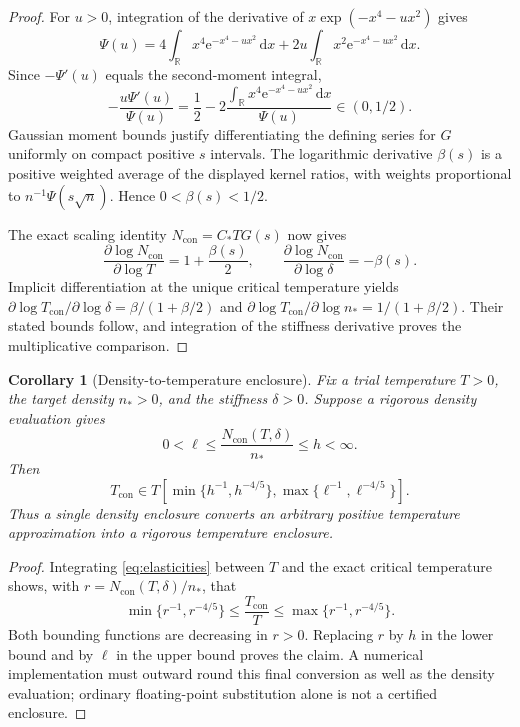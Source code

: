 \documentclass[11pt,a4paper]{article}
\numberwithin{equation}{section}
\newtheorem{corollary}[theorem]{Corollary}
\theoremstyle{definition}
\newcommand{\R}{\mathbb R}
\newcommand{\dd}{\,\mathrm d}
\newcommand{\con}{\mathrm{con}}
\newcommand{\e}{\mathrm e}
\begin{document}
\begin{proof}
For $u>0$, integration of the derivative of
$x\exp(-x^4-u x^2)$ gives
\[
 \Psi(u)=4\int_{\R} x^4\e^{-x^4-u x^2}\dd x
       +2u\int_{\R} x^2\e^{-x^4-u x^2}\dd x.
\]
Since $-\Psi'(u)$ equals the second-moment integral,
\[
 -\frac{u\Psi'(u)}{\Psi(u)}
 =\frac12-
 2\frac{\int_{\R} x^4\e^{-x^4-u x^2}\dd x}{\Psi(u)}
 \in(0,1/2).
\]
Gaussian moment bounds justify differentiating the defining series for
$G$ uniformly on compact positive $s$ intervals. The logarithmic
derivative $\beta(s)$ is a positive weighted average of the displayed
kernel ratios, with weights proportional to
$n^{-1}\Psi(s\sqrt n)$. Hence $0<\beta(s)<1/2$.

The exact scaling identity $N_{\con}=C_*T G(s)$ now gives
\[
 \frac{\partial\log N_{\con}}{\partial\log T}
       =1+\frac{\beta(s)}2,
 \qquad
 \frac{\partial\log N_{\con}}{\partial\log\delta}=-\beta(s).
\]
Implicit differentiation at the unique critical temperature yields
$\partial\log T_{\con}/\partial\log\delta
=\beta/(1+\beta/2)$ and
$\partial\log T_{\con}/\partial\log n_*
=1/(1+\beta/2)$. Their stated bounds follow, and integration of the
stiffness derivative proves the multiplicative comparison.
\end{proof}

\begin{corollary}[Density-to-temperature enclosure]
\label{cor:densitytemperature}
Fix a trial temperature $T>0$, the target density $n_*>0$, and the
stiffness $\delta>0$. Suppose a rigorous density evaluation gives
\[
 0<\ell\le \frac{N_{\con}(T,\delta)}{n_*}\le h<\infty.
\]
Then
\begin{equation}
 T_{\con}\in T\left[
 \min\{h^{-1},h^{-4/5}\},
 \max\{\ell^{-1},\ell^{-4/5}\}
 \right].
 \label{eq:temperatureenclosure}
\end{equation}
Thus a single density enclosure converts an arbitrary positive
temperature approximation into a rigorous temperature enclosure.
\end{corollary}

\begin{proof}
Integrating \eqref{eq:elasticities} between $T$ and the exact critical
temperature shows, with $r=N_{\con}(T,\delta)/n_*$, that
\[
 \min\{r^{-1},r^{-4/5}\}
 \le \frac{T_{\con}}{T}
 \le \max\{r^{-1},r^{-4/5}\}.
\]
Both bounding functions are decreasing in $r>0$. Replacing $r$ by
$h$ in the lower bound and by $\ell$ in the upper bound proves the
claim. A numerical implementation must outward round this final
conversion as well as the density evaluation; ordinary floating-point
substitution alone is not a certified enclosure.
\end{proof}
\end{document}
